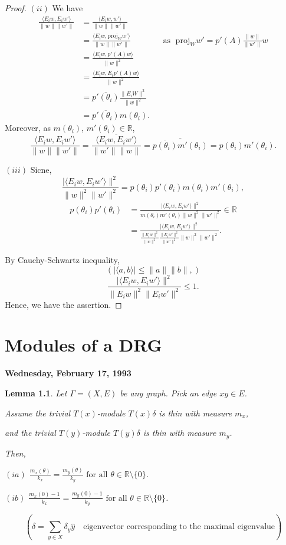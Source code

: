 \documentclass[
]{book}
\newtheorem{lemma}{Lemma}[chapter]
\theoremstyle{definition}
\theoremstyle{definition}
\theoremstyle{definition}
\theoremstyle{definition}
\theoremstyle{remark}
\begin{document}
\begin{proof}
\((ii)\) We have
\begin{align}
\frac{\langle E_iw, E_iw'\rangle}{\|w\|\|w'\|}
& = \frac{\langle E_iw, w'\rangle}{\|w\|\|w'\|}\\
& = \frac{\langle E_iw, \mathrm{proj}_W w'\rangle}{\|w\|\|w'\|} && \text{as }\; \mathrm{proj}_Ww' = p'(A)\frac{\|w\|}{\|w'\|}w\\
& = \frac{\langle E_iw, p'(A) w\rangle}{\|w\|^2}\\
& = \frac{\langle E_iw, E_ip'(A) w\rangle}{\|w\|^2}\\
& = \overline{p'(\theta_i)}\frac{\|E_iW\|^2}{\|w\|^2}\\
& = \overline{p'(\theta_i)}m(\theta_i).
\end{align}
Moreover, as \(m(\theta_i)\), \(m'(\theta_i)\in \mathbb{R}\),
\[\frac{\langle E_iw, E_iw'\rangle}{\|w\|\|w'\|}  = \frac{\overline{\langle E_iw, E_iw'\rangle}}{\|w'\|\|w\|}
 = \overline{\overline{p(\theta_i)}m'(\theta_i)} 
 = p(\theta_i)m'(\theta_i).\]

\((iii)\) Sicne,
\[\frac{|\langle E_iw, E_iw'\rangle\|^2}{\|w\|^2\|w'\|^2} = p(\theta_i)p'(\theta_i)m(\theta_i)m'(\theta_i),\]
\begin{align}
p(\theta_i)p'(\theta_i) & = \frac{|\langle E_iw, E_iw'\rangle\|^2}{m(\theta_i)m'(\theta_i)\|w\|^2\|w'\|^2} \in \mathbb{R}\\
& = \frac{|\langle E_iw, E_iw'\rangle\|^2}{\frac{\|E_iw\|^2}{\|w\|^2}\frac{\|E_iw'\|^2}{\|w'\|^2}\|w\|^2\|w'\|^2}.
\end{align}

By Cauchy-Schwartz inequality,
\[(|\langle a, b\rangle | \leq \|a\|\|b\|,)\]
\[\frac{|\langle E_iw, E_iw'\rangle\|^2}{\|E_iw\|^2\|E_iw'\|^2} \leq 1.\]
Hence, we have the assertion.
\end{proof}

\hypertarget{lec13}{%
\chapter{Modules of a DRG}\label{lec13}}

\textbf{Wednesday, February 17, 1993}

\begin{lemma}
\protect\hypertarget{lem:two-principal-modules}{}\label{lem:two-principal-modules}Let \(\Gamma = (X, E)\) be any graph. Pick an edge \(xy\in E\).

Assume the trivial \(T(x)\)-module \(T(x)\delta\) is thin with measure \(m_x\),

and the trivial \(T(y)\)-module \(T(y)\delta\) is thin with measure \(m_y\).

Then,

\((ia)\) \({\displaystyle \frac{m_x(\theta)}{k_x} = \frac{m_y(\theta)}{k_y} \text{ for all } \theta\in \mathbb{R}\setminus \{0\}}\).

\((ib)\) \({\displaystyle \frac{m_x(0) -1}{k_x} = \frac{m_y(0)-1}{k_y} \text{ for all } \theta\in \mathbb{R}\setminus \{0\}}\).

\[(\delta = \sum_{y\in X}\delta_y \hat{y} \quad \text{eigenvector corresponding to the maximal eigenvalue})\]
\end{lemma}
\end{document}
